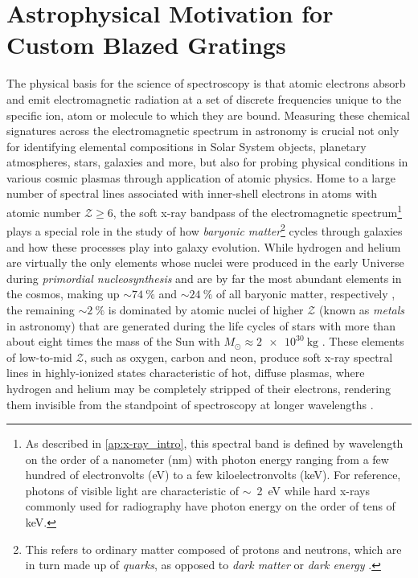 \chapter[Astrophysical Motivation for Custom Blazed Gratings]{Astrophysical Motivation for \\Custom Blazed Gratings}\label{ch:introduction}
The physical basis for the science of spectroscopy is that atomic electrons absorb and emit electromagnetic radiation at a set of discrete frequencies unique to the specific ion, atom or molecule to which they are bound. 
Measuring these chemical signatures across the electromagnetic spectrum in astronomy is crucial not only for identifying elemental compositions in Solar System objects, planetary atmospheres, stars, galaxies and more, but also for probing physical conditions in various cosmic plasmas through application of atomic physics. 
Home to a large number of spectral lines associated with inner-shell electrons in atoms with atomic number $\mathcal{Z} \geq 6$, the soft x-ray bandpass of the electromagnetic spectrum\footnote{As described in \cref{ap:x-ray_intro}, this spectral band is defined by wavelength on the order of a nanometer (\si{\nm}) with photon energy ranging from a few hundred of electronvolts (\si{\electronvolt}) to a few kiloelectronvolts (\si{\kilo\electronvolt}). For reference, photons of visible light are characteristic of $\sim$~\SI{2}{\electronvolt} while hard x-rays commonly used for radiography have photon energy on the order of tens of \si{\kilo\electronvolt}.} plays a special role in the study of how \emph{baryonic matter}\footnote{This refers to ordinary matter composed of protons and neutrons, which are in turn made up of \emph{quarks}, as opposed to \emph{dark matter} or \emph{dark energy} \cite{Liddle03}.} cycles through galaxies and how these processes play into galaxy evolution. %
While hydrogen and helium are virtually the only elements whose nuclei were produced in the early Universe during \emph{primordial nucleosynthesis} and are by far the most abundant elements in the cosmos, making up $\sim \SI{74}{\percent}$ and $\sim \SI{24}{\percent}$ of all baryonic matter, respectively \cite{Mo10,Liddle03,Schneider06}, the remaining $\sim \SI{2}{\percent}$ is dominated by atomic nuclei of higher $\mathcal{Z}$ (known as \emph{metals} in astronomy) that are generated during the life cycles of stars with more than about eight times the mass of the Sun with $M_{\odot} \approx \SI{2e30}{\kilogram}$ \cite[\emph{cf.\@} \cref{ap:quantum_spectral}]{Hoyle46,Rolfs88,Carroll07,Ryden10}. 
These elements of low-to-mid $\mathcal{Z}$, such as oxygen, carbon and neon, produce soft x-ray spectral lines in highly-ionized states characteristic of hot, diffuse plasmas, where hydrogen and helium may be completely stripped of their electrons, rendering them invisible from the standpoint of spectroscopy at longer wavelengths \cite{Kahn02}. 

